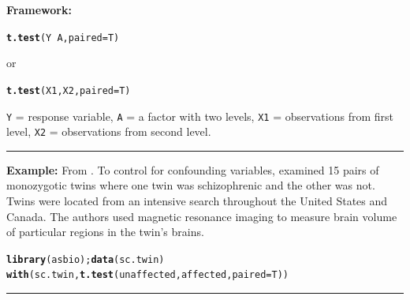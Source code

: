 \documentclass[12pt,english]{article}\usepackage[]{graphicx}\usepackage[table]{xcolor}
\makeatletter
\newcommand{\hlopt}[1]{\textcolor[rgb]{0,0,0}{#1}}%
\newcommand{\hldef}[1]{\textcolor[rgb]{0.345,0.345,0.345}{#1}}%
\newcommand{\hlkwc}[1]{\textcolor[rgb]{0.333,0.667,0.333}{#1}}%
\newcommand{\hlkwd}[1]{\textcolor[rgb]{0.737,0.353,0.396}{\textbf{#1}}}%
\newenvironment{kframe}{%
 \def\at@end@of@kframe{}%
 \ifinner\ifhmode%
  \def\at@end@of@kframe{\end{minipage}}%
  \begin{minipage}{\columnwidth}%
 \fi\fi%
 \def\FrameCommand##1{\hskip\@totalleftmargin \hskip-\fboxsep
 \colorbox{shadecolor}{##1}\hskip-\fboxsep
     \hskip-\linewidth \hskip-\@totalleftmargin \hskip\columnwidth}%
 \MakeFramed {\advance\hsize-\width
   \@totalleftmargin\z@ \linewidth\hsize
   \@setminipage}}%
 {\par\unskip\endMakeFramed%
 \at@end@of@kframe}
\newenvironment{knitrout}{}{} %
\makeatother
\begin{document}
\begin{tcolorbox}[colback=yellow!50!red!25!white,colbacktitle=yellow!50!red,colframe=black!75!white,title=\textbf{R:} Paired $t$-Test]
\textbf{Framework:}\\
\vspace{-.2in}
\begin{knitrout}
\color{fgcolor}\begin{kframe}
\begin{alltt}
\hlkwd{t.test}\hldef{(Y} \hlopt{~} \hldef{A,} \hlkwc{paired} \hldef{= T)}
\end{alltt}
\end{kframe}
\end{knitrout}
\vspace{-.1in}
or
\vspace{-.1in}
\begin{knitrout}
\color{fgcolor}\begin{kframe}
\begin{alltt}
\hlkwd{t.test}\hldef{(X1, X2,} \hlkwc{paired} \hldef{= T)}
\end{alltt}
\end{kframe}
\end{knitrout}
\texttt{Y} = response variable, \texttt{A} = a factor with two levels, \texttt{X1} = observations from first level, \texttt{X2} = observations from second level.
\vspace{0.1in}
\par\noindent\rule{.9\textwidth}{0.4pt}

\textbf{Example:} From \citep{aho2014}.  To control for confounding variables, \citet{suddath1990} examined 15 pairs of monozygotic twins where one twin was schizophrenic and the other was not. Twins were located from an intensive search throughout the United States and Canada. The authors used magnetic resonance imaging to measure brain volume of particular regions in the twin's brains.
\vspace{-.1in}
\begin{knitrout}
\color{fgcolor}\begin{kframe}
\begin{alltt}
\hlkwd{library}\hldef{(asbio);} \hlkwd{data}\hldef{(sc.twin)}
\hlkwd{with}\hldef{(sc.twin,} \hlkwd{t.test}\hldef{(unaffected, affected,} \hlkwc{paired} \hldef{= T))}
\end{alltt}
\end{kframe}
\end{knitrout}
\end{tcolorbox}
\par\noindent\rule{.9\textwidth}{0.4pt}
\newpage
\end{document}
